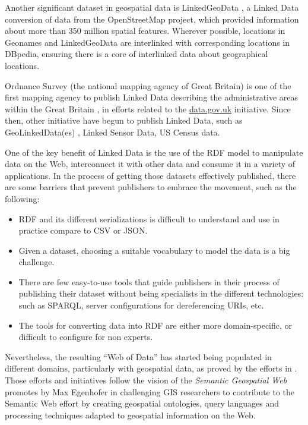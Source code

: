 Another significant dataset in geospatial data is LinkedGeoData \cite{linkedgeodata}, a Linked Data conversion of data from the OpenStreetMap project, which provided information about more than 350 million spatial features. Wherever possible, locations in Geonames and LinkedGeoData are interlinked with corresponding locations in DBpedia, ensuring there is a core of interlinked data about geographical locations.

Ordnance Survey (the national mapping agency of Great Britain) is one of the first mapping agency to publish Linked Data describing the administrative areas within the Great Britain \cite{Goodwin2008}, in efforts related to the \url{data.gov.uk} initiative. Since then, other initiative have begun to publish Linked Data, such as GeoLinkedData(es) \cite{deLeon2010}, Linked Sensor Data, US Census data.

One of the key benefit of Linked Data is the use of the  RDF model to manipulate data on the Web, interconnect it with other data and consume it in a variety of applications. In the process of getting those datasets effectively published, there are some barriers that prevent publishers to embrace the movement, such as the following:
\begin{itemize}
 \item RDF and its different serializations is difficult to understand and use in practice compare to CSV or JSON.
 \item Given a dataset, choosing a suitable vocabulary to model the data is a big challenge.
 \item There are few easy-to-use tools that guide publishers in their process of publishing their dataset without being specialists in the different technologies: such as SPARQL, server configurations for dereferencing URIs, etc.
 \item The tools for converting data into RDF are either more domain-specific, or difficult to configure for non experts.
\end{itemize}

Nevertheless, the resulting ``Web of Data'' has started being populated in different domains, particularly with geospatial data, as proved by the efforts in \cite{goodwin08,linkedgeodata,deLeon2010,Salas2011}. Those efforts and initiatives follow the vision of the \textit{Semantic Geospatial Web} promotes by Max Egenhofer in \cite{egenhofer12} challenging GIS researchers to contribute to the Semantic Web effort by creating geospatial ontologies, query languages and processing techniques adapted to geospatial information on the Web.



